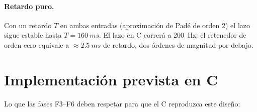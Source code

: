 \documentclass[11pt,a4paper]{article}
\begin{document}
\paragraph{Retardo puro.} Con un retardo $T$ en ambas entradas (aproximación
de Padé de orden 2) el lazo sigue estable hasta $T = \SI{160}{ms}$. El lazo
en C correrá a \SI{200}{Hz}: el retenedor de orden cero equivale a
$\approx\SI{2.5}{ms}$ de retardo, dos órdenes de magnitud por debajo.

\section{Implementación prevista en C}
\label{sec:impl}

Lo que las fases F3--F6 deben respetar para que el C reproduzca este diseño:
\end{document}
